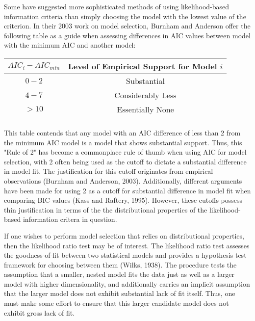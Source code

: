 		Some have suggested more sophisticated methods of using likelihood-based information criteria than simply choosing the model with the lowest value of the criterion. In their 2003 work on 
		model selection, Burnham and Anderson offer the following table as a guide when assessing differences in AIC values between model with the minimum AIC and another model:
		\pagebreak

		\begin{table}[h]
		\centering
		{
		\begin{tabular}{ c|c}
		$AIC_{i}-AIC_{min}$ & Level of Empirical Support for Model $i$\\
		 \hline
		 $0 - 2$ & Substantial\\
		 $4 - 7$ & Considerably Less\\
		 $> 10$ & Essentially None\\
		 \Xhline{3\arrayrulewidth}
		\end{tabular}
		}
		\end{table}	
		
		This table contends that any model with an AIC difference of less than $2$ from the minimum AIC model is a model that shows substantial support. Thus, this "Rule of 2" has become a
		commonplace rule of thumb when using AIC for model selection, with 2 often being used as the cutoff to dictate a substantial difference in model fit. The justification for this cutoff originates
		from empirical observations (Burnham and Anderson, 2003). Additionally, different  arguments have been made for using 2 as a cutoff for substantial difference in model fit
		when comparing BIC values (Kass and Raftery, 1995). However, these cutoffs possess thin justification in terms of the the distributional properties of the likelihood-based information
		critera in question.

		If one wishes to perform model selection that relies on distributional properties, then the likelihood ratio test may be of interest. The likelihood ratio test assesses the
		goodness-of-fit between two statistical models and provides a hypothesis test framework for choosing between them (Wilks, 1938). The procedure tests the assumption that
		a smaller, nested model fits the data just as well as a larger model with higher dimensionality, and additionally carries an implicit assumption that the larger model does
		not exhibit substantial lack of fit itself. Thus, one must make some effort to ensure that this larger candidate model does not exhibit gross lack of fit.

